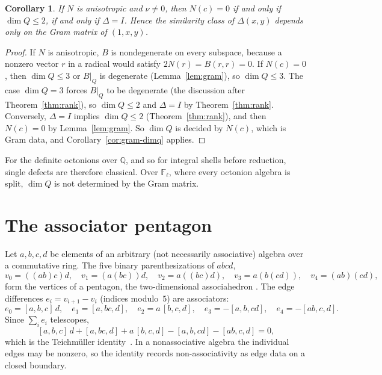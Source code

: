 \documentclass[11pt]{amsart}
\newtheorem{corollary}[theorem]{Corollary}
\theoremstyle{definition}
\theoremstyle{remark}
\newcommand{\F}{\mathbb{F}}
\newcommand{\Q}{\mathbb{Q}}
\newcommand{\assoc}[3]{[#1,#2,#3]}
\begin{document}
\begin{corollary}\label{cor:anisotropic}
If $N$ is anisotropic and $\nu\neq0$, then $N(c)=0$ if and only if
$\dim Q\le2$, if and only if $\Delta=I$. Hence the similarity class of
$\Delta(x,y)$ depends only on the Gram matrix of $(1,x,y)$.
\end{corollary}

\begin{proof}
If $N$ is anisotropic, $B$ is nondegenerate on every subspace, because a
nonzero vector $r$ in a radical would satisfy $2N(r)=B(r,r)=0$. If $N(c)=0$,
then $\dim Q\le3$ or $B|_Q$ is degenerate (Lemma~\ref{lem:gram}), so
$\dim Q\le3$. The case $\dim Q=3$ forces $B|_Q$ to be degenerate (the
discussion after Theorem~\ref{thm:rank}), so $\dim Q\le2$ and $\Delta=I$ by
Theorem~\ref{thm:rank}. Conversely, $\Delta=I$ implies $\dim Q\le2$
(Theorem~\ref{thm:rank}), and then $N(c)=0$ by Lemma~\ref{lem:gram}. So
$\dim Q$ is decided by $N(c)$, which is Gram data, and
Corollary~\ref{cor:gram-dimq} applies.
\end{proof}

For the definite octonions over $\Q$, and so for integral shells before
reduction, single defects are therefore classical. Over $\F_\ell$, where every
octonion algebra is split, $\dim Q$ is not determined by the Gram matrix.

\section{The associator pentagon}\label{sec:pentagon}

Let $a,b,c,d$ be elements of an arbitrary (not necessarily associative)
algebra over a commutative ring. The five binary parenthesizations of $abcd$,
\[
  v_0=((ab)c)d,\quad v_1=(a(bc))d,\quad v_2=a((bc)d),\quad
  v_3=a(b(cd)),\quad v_4=(ab)(cd),
\]
form the vertices of a pentagon, the two-dimensional associahedron
\cite{stasheff1963,maclane1963}. The edge differences $e_i=v_{i+1}-v_i$
(indices modulo~$5$) are associators:
\begin{equation}\label{eq:edges}
  e_0=\assoc abc\,d,\quad e_1=\assoc{a}{bc}{d},\quad e_2=a\,\assoc bcd,\quad
  e_3=-\assoc{a}{b}{cd},\quad e_4=-\assoc{ab}{c}{d}.
\end{equation}
Since $\sum_ie_i$ telescopes,
\begin{equation}\label{eq:teich}
  \assoc abc\,d+\assoc{a}{bc}{d}+a\,\assoc bcd-\assoc{a}{b}{cd}-\assoc{ab}{c}{d}=0,
\end{equation}
which is the Teichm\"uller identity~\cite{zhevlakov1982}. In a
nonassociative algebra the individual edges may be nonzero, so the identity
records non-associativity as edge data on a closed boundary.
\end{document}
